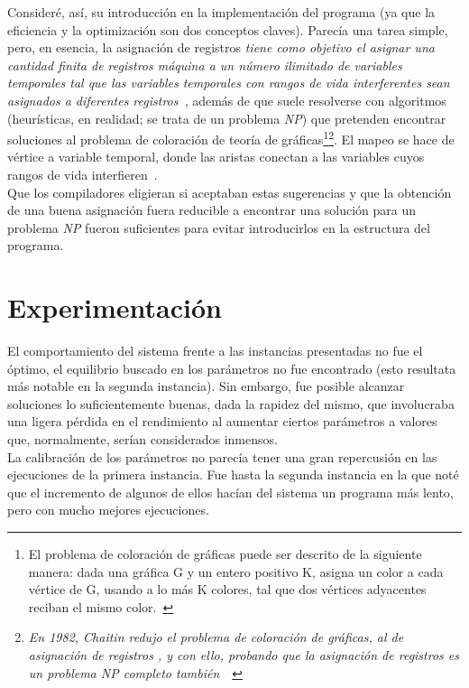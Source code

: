 \documentclass[a4paper]{report}
\begin{document}
Consider\'e, as\'i, su introducci\'on en la implementaci\'on del programa (ya que la eficiencia y la optimizaci\'on son
dos conceptos claves). Parec\'ia una tarea simple, pero, en esencia, la asignaci\'on
de registros \textit{tiene como objetivo el asignar una cantidad finita de registros m\'aquina a un n\'umero
  ilimitado de variables temporales tal que las variables temporales con rangos de vida interferentes sean
  asignados a diferentes registros~\cite{reg}}, adem\'as de que suele resolverse con algoritmos (heur\'isticas,
en realidad; se trata de un problema \textit{NP}) que
pretenden encontrar soluciones al problema de coloraci\'on de teor\'ia de gr\'aficas\footnote{El problema de
  coloraci\'on de gr\'aficas puede ser descrito de la siguiente manera: dada una gr\'afica G y un entero positivo
  K, asigna un color a cada v\'ertice de G, usando a lo m\'as K colores, tal que dos v\'ertices adyacentes reciban
  el mismo color.~\cite{reg}}\footnote{\textit{En 1982, Chaitin redujo el problema de coloraci\'on de gr\'aficas, al de
    asignaci\'on de registros , y con ello, probando que la asignaci\'on de registros es un problema NP completo
    tambi\'en}~\cite{reg}~\cite{chaitin}}. El mapeo se hace de v\'ertice a variable temporal, donde las aristas
conectan a las variables cuyos rangos de vida interfieren~\cite{reg}.\\

Que los compiladores eligieran si aceptaban estas sugerencias y que la obtenci\'on de una buena asignaci\'on
fuera reducible a encontrar una soluci\'on para un problema \textit{NP} fueron suficientes para evitar
introducirlos en la estructura del programa.

\chapter{Experimentaci\'on}
El comportamiento del sistema frente a las instancias presentadas no fue el \'optimo, el equilibrio
buscado en los par\'ametros no fue encontrado (esto resultata m\'as notable en la segunda instancia).
Sin embargo, fue posible alcanzar soluciones lo suficientemente buenas, dada la rapidez del mismo, que involucraba
una ligera p\'erdida en el rendimiento al aumentar ciertos par\'ametros a valores que, normalmente,
ser\'ian considerados inmensos.\\

La calibraci\'on de los par\'ametros no parec\'ia tener una gran repercusi\'on en
las ejecuciones de la primera instancia. Fue hasta la segunda instancia
en la que not\'e que el incremento de algunos de ellos hac\'ian del sistema un programa m\'as
lento, pero con mucho mejores ejecuciones.\\
\end{document}
